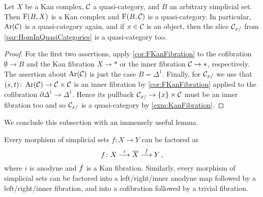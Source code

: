 \begin{cor}\label{cor:FIsKanComplex}
	Let $X$ be a Kan complex, $\mathcal{C}$ a quasi-category, and $B$ an arbitrary simplicial set. Then $\operatorname{F}(B,X)$ is a Kan complex and $\operatorname{F}(B,\mathcal{C})$ is a quasi-category. In particular, $\operatorname{Ar}(\mathcal{C})$ is a quasi-category again, and if $x\in \mathcal{C}$ is an object, then the slice $\mathcal{C}_{x/}$ from \cref{par:HomInQuasiCategories} is a quasi-category too.
\end{cor}
\begin{proof}
	For the first two assertions, apply \cref{cor:FKanFibration} to the cofibration $\emptyset\rightarrow B$ and the Kan fibration $X\rightarrow *$ or the inner fibration $\mathcal{C}\rightarrow *$, respectively. The assertion about $\operatorname{Ar}(\mathcal{C})$ is just the case $B=\Delta^1$. Finally, for $\mathcal{C}_{x/}$ we use that $(s,t)\colon \operatorname{Ar}(\mathcal{C})\rightarrow \mathcal{C}\times\mathcal{C}$ is an inner fibration by \cref{cor:FKanFibration} applied to the cofibration $\partial\Delta^1\rightarrow\Delta^1$. Hence its pullback $\mathcal{C}_{x/}\rightarrow \{x\}\times \mathcal{C}$ must be an inner fibration too and so $\mathcal{C}_{x/}$ is a quasi-category by \cref{exm:KanFibration}.
\end{proof}
We conclude this subsection with an immensely useful lemma.
\begin{lem}\label{lem:SmallObjectArgument}
	Every morphism of simplicial sets $f\colon X\rightarrow Y$ can be factored as
	\begin{equation*}
		f\colon X\overset{i}{\longrightarrow}\ov X\overset{\ov f}{\longrightarrow}Y\,,
	\end{equation*}
	where $i$ is anodyne and $\ov f$ is a Kan fibration. Similarly, every morphism of simplicial sets can be factored into a left/right/inner anodyne map followed by a left/right/inner fibration, and into a cofibration followed by a trivial fibration.
\end{lem}
